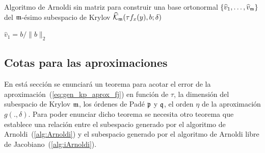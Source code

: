 {\SetAlgoNoLine
	\begin{algorithm}
		\caption{\cite{brown1987local} Algoritmo de Arnoldi sin matriz para construir una base ortonormal $\{\widehat{v}_1,\ldots,\widehat{v}_{\mathfrak{m}} \}$ 
			del $\mathfrak{m}$-ésimo subespacio de Krylov $\widehat{\mathcal{K}}_{\mathfrak{m}}(\tau f_x(y),b;\delta)$}
		\label{alg:iArnoldi}
		$\widehat{v}_1=b/\lVert b \rVert_2$\\
	\end{algorithm}
}

 \subsection{Cotas para las aproximaciones}
  En está sección se enunciará un teorema para acotar el error de la aproximación~(\ref{eq:gen_kp_aprox_fj}) en función de $\tau$, la dimensión del subespacio de Krylov $\mathfrak{m}$, los órdenes de Padé $\mathfrak{p}$ y $\mathfrak{q}$, el orden $\eta$ de la aproximación $g(.,\delta)$. Para poder enunciar dicho teorema se necesita otro teorema que establece una relación entre el subespacio generado por el algoritmo de Arnoldi~(\ref{alg:Arnoldi}) y el subespacio generado por el algoritmo de Arnoldi libre de Jacobiano~(\ref{alg:iArnoldi}).

